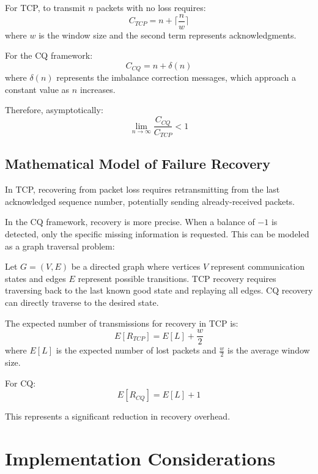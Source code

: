 \documentclass[../OAE-SPEC-MAIN.tex]{subfiles}
\begin{document}
For TCP, to transmit $n$ packets with no loss requires:
\begin{equation}
C_{TCP} = n + \lceil \frac{n}{w} \rceil
\end{equation}
where $w$ is the window size and the second term represents acknowledgments.

For the CQ framework:
\begin{equation}
C_{CQ} = n + \delta(n)
\end{equation}
where $\delta(n)$ represents the imbalance correction messages, which approach a constant value as $n$ increases.

Therefore, asymptotically:
\begin{equation}
\lim_{n\to\infty} \frac{C_{CQ}}{C_{TCP}} < 1
\end{equation}

\subsection{Mathematical Model of Failure Recovery}

In TCP, recovering from packet loss requires retransmitting from the last acknowledged sequence number, potentially sending already-received packets.

In the CQ framework, recovery is more precise. When a balance of $-1$ is detected, only the specific missing information is requested. This can be modeled as a graph traversal problem:

Let $G = (V, E)$ be a directed graph where vertices $V$ represent communication states and edges $E$ represent possible transitions. TCP recovery requires traversing back to the last known good state and replaying all edges. CQ recovery can directly traverse to the desired state.

The expected number of transmissions for recovery in TCP is:
\begin{equation}
E[R_{TCP}] = E[L] + \frac{w}{2}
\end{equation}
where $E[L]$ is the expected number of lost packets and $\frac{w}{2}$ is the average window size.

For CQ:
\begin{equation}
E[R_{CQ}] = E[L] + 1
\end{equation}

This represents a significant reduction in recovery overhead.

\section{Implementation Considerations}
\end{document}
